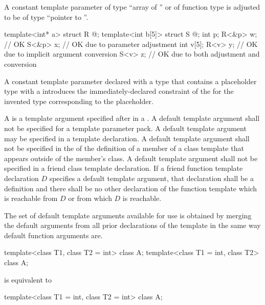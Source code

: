 \pnum
A constant template parameter
%
of type ``array of '' or
%
of function type 
is adjusted to be of type ``pointer to ''.
\begin{example}
\begin{codeblock}
template<int* a>   struct R { @\commentellip@ };
template<int b[5]> struct S { @\commentellip@ };
int p;
R<&p> w;                        // OK
S<&p> x;                        // OK due to parameter adjustment
int v[5];
R<v> y;                         // OK due to implicit argument conversion
S<v> z;                         // OK due to both adjustment and conversion
\end{codeblock}
\end{example}

\pnum
A constant template parameter declared with a type that
contains a placeholder type with a 
introduces the immediately-declared constraint
of the 
for the invented type corresponding to the placeholder.

\pnum
A  is
a template argument specified after \tcode{=}
in a .
A default template argument shall not be specified for
a template parameter pack.
A default template argument may be specified in a template declaration.
A default template argument shall not be specified in
the 
of the definition of a member of a class template
that appears outside of the member's class.
A default template argument
shall not be specified in a friend class template declaration.
If a friend function template declaration $D$
specifies a default template argument,
that declaration shall be a definition and
there shall be no other declaration of the function template
which is reachable from $D$ or from which $D$ is reachable.

\pnum
The set of default template arguments
available for use is obtained by merging the default arguments
from all prior declarations of the template in the
same way default function arguments are.
\begin{example}
\begin{codeblock}
template<class T1, class T2 = int> class A;
template<class T1 = int, class T2> class A;
\end{codeblock}
is equivalent to
\begin{codeblock}
template<class T1 = int, class T2 = int> class A;
\end{codeblock}
\end{example}

